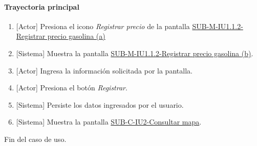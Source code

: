 \paragraph{Trayectoria principal}
	\begin{enumerate}
		\item {[Actor]} Presiona el icono \textit{Registrar precio} de la pantalla \hyperref[fig:sub-m-iu1.1.2.a]{SUB-M-IU1.1.2-Registrar precio gasolina (a)}
		\item {[Sistema]} Muestra la pantalla \hyperref[fig:sub-m-iu1.1.2.b]{SUB-M-IU1.1.2-Registrar precio gasolina (b)}.
		\item {[Actor]} Ingresa la información solicitada por la pantalla.
		\item {[Actor]} Presiona el botón \textit{Registrar}.
		\item {[Sistema]} Persiste los datos ingresados por el usuario.
		\item {[Sistema]} Muestra la pantalla \hyperref[fig:sub-c-iu2]{SUB-C-IU2-Consultar mapa}.
	\end{enumerate}
	Fin del caso de uso.